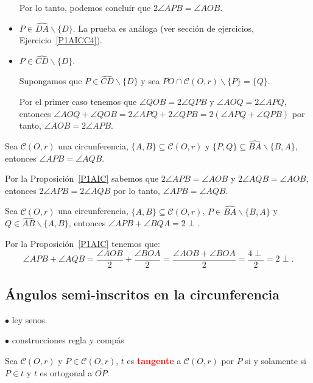 \begin{pba}
\begin{itemize}
Por lo tanto, podemos concluir que $2\angle APB=\angle AOB.$

\item $P\in\widehat{DA}\backslash\{D\}.$ La prueba es análoga (ver sección de ejercicios, Ejercicio~\ref{P1AICC4}).

\item $P\in\widehat{CD}\backslash\{D\}.$

Supongamos que $P\in\widehat{CD}\backslash\{D\}$ y sea $\overline{PO}\cap\mathcal{C}(O,r)\backslash\{P\}=\{Q\}.$

Por el primer caso tenemos que $\angle QOB=2\angle QPB$ y $\angle AOQ=2\angle APQ$, entonces $\angle AOQ+\angle QOB=2\angle APQ+2\angle QPB=2(\angle APQ+\angle QPB)$ por tanto, $\angle AOB=2\angle APB.$
\end{itemize}
\end{pba}
\begin{cor}\label{C1AIC}
Sea $\mathcal{C}(O,r)$ una circunferencia, $\{A,B\}\subseteq\mathcal{C}(O,r)$ y $\{P,Q\}\subseteq\widehat{BA}\backslash\{B, A\}$, entonces $\angle APB=\angle AQB.$
\end{cor}
\begin{pba}
Por la Proposición~\ref{P1AIC} sabemos que $2\angle APB=\angle AOB$ y $2\angle AQB=\angle AOB$, entonces $2\angle APB=2\angle AQB$ por lo tanto, $\angle APB=\angle AQB.$ 
\end{pba}

\begin{cor}
Sea $\mathcal{C}(O,r)$ una circunferencia, $\{A,B\}\subseteq\mathcal{C}(O,r)$, $P\in\widehat{BA}\backslash\{B, A\}$ y $Q\in\widehat{AB}\backslash\{A,B\}$, entonces $\angle APB+\angle BQA=2\perp.$
\end{cor}
\begin{pba}
Por la Proposición~\ref{P1AIC} tenemos que: 
$$\angle APB+\angle AQB=\frac{\angle AOB}{2}+\frac{\angle BOA}{2}=\frac{\angle AOB+\angle BOA}{2}=\frac{4\perp}{2}=2\perp.$$
\end{pba}

\subsection{Ángulos semi-inscritos en la circunferencia}

$\bullet$ ley senos.

$\bullet$ construcciones regla y compás

\begin{df}
Sea $\mathcal{C}(O,r)$ y $P\in\mathcal{C}(O,r)$, $t$ es \textcolor{red}{\bf tangente} a $\mathcal{C}(O,r)$ por $P$ si y solamente si $P\in t$ y $t$ es ortogonal a $\overline{OP}.$
\end{df}

